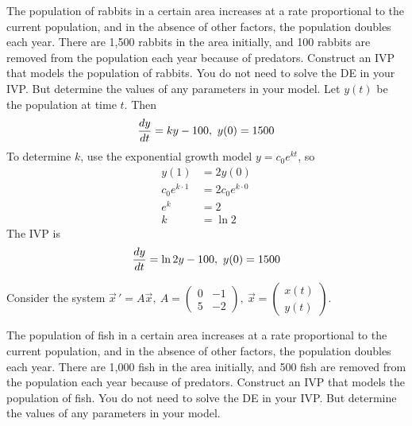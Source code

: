 \question[2]{} The population of rabbits in a certain area increases at a rate proportional to the current population, and in the absence of other factors, the population doubles each year. There are 1,500 rabbits in the area initially, and 100 rabbits are removed from the population each year because of predators. Construct an IVP that models the population of rabbits. You do not need to solve the DE in your IVP. But determine the values of any parameters in your model. 
\ifnum {} {\color{DarkBlue} 
Let $y(t)$ be the population at time $t$. Then 
$${\frac{dy}{dt}} = ky - 100, \ y(0) = 1500$$
To determine $k$, use the exponential growth model $y = c_0e^{kt}$, so 
\begin{align}
    y(1) & = 2y(0) \\
    c_0e^{k\cdot1} &= 2c_0e^{k\cdot0} \\
    e^{k} &= 2 \\
    k &= \ln 2
\end{align}
The IVP is 
$${\frac{dy}{dt}} = \ln2 y - 100, \ y(0) = 1500$$
} 
\else 
\fi
\fi


\ifnum {}
\question[2] Consider the system $\displaystyle \vec x \, ' = A\vec x, \ A = \begin{pmatrix} 0&-1\\5&-2 \end{pmatrix}, \ \vec x = \begin{pmatrix} x(t)\\y(t)\end{pmatrix} $.
\question[2]{} The population of fish in a certain area increases at a rate proportional to the current population, and in the absence of other factors, the population doubles each year. There are 1,000 fish in the area initially, and 500 fish are removed from the population each year because of predators. Construct an IVP that models the population of fish. You do not need to solve the DE in your IVP. But determine the values of any parameters in your model. 
\fi



